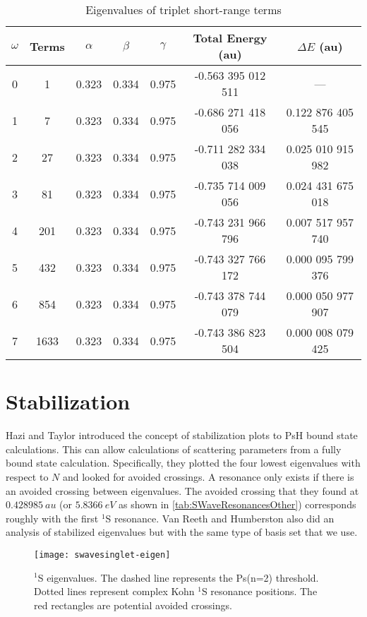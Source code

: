 \documentclass[Dissertation.tex]{subfiles}
\begin{document}
\setlength{\abovecaptionskip}{6pt}   %
\setlength{\belowcaptionskip}{6pt}   %
\begin{table}[H]
\centering
\begin{tabular}{c c c c c c c}
\toprule
$\omega$ & Terms & $\alpha$ & $\beta$ & $\gamma$ & Total Energy (au) & $\Delta E$ (au) \\ [0.5ex]
\midrule
0 & 1    & 0.323 & 0.334 & 0.975 & -0.563 395 012 511 & --- \\
1 & 7    & 0.323 & 0.334 & 0.975 & -0.686 271 418 056 & 0.122 876 405 545 \\
2 & 27   & 0.323 & 0.334 & 0.975 & -0.711 282 334 038 & 0.025 010 915 982 \\
3 & 81   & 0.323 & 0.334 & 0.975 & -0.735 714 009 056 & 0.024 431 675 018 \\
4 & 201  & 0.323 & 0.334 & 0.975 & -0.743 231 966 796 & 0.007 517 957 740 \\
5 & 432  & 0.323 & 0.334 & 0.975 & -0.743 327 766 172 & 0.000 095 799 376 \\
6 & 854  & 0.323 & 0.334 & 0.975 & -0.743 378 744 079 & 0.000 050 977 907 \\
7 & 1633 & 0.323 & 0.334 & 0.975 & -0.743 386 823 504 & 0.000 008 079 425 \\
\bottomrule
\end{tabular}
\caption{Eigenvalues of triplet short-range terms}
\label{tab:BoundEnergyTodd3}
\end{table}


\section{Stabilization}



Hazi and Taylor \cite{Hazi1970} introduced the concept of stabilization plots to PsH bound state calculations. This can allow calculations of scattering parameters from a fully bound state calculation. Specifically, they plotted the four lowest eigenvalues with respect to $N$ and looked for avoided crossings. A resonance only exists if there is an avoided crossing between eigenvalues. The avoided crossing that they found at $\SI{0.428 985}{au}$ (or $\SI{5.8366}{eV}$ as shown in \cref{tab:SWaveResonancesOther}) corresponds roughly with the first $^1$S resonance. Van Reeth and Humberston \cite{VanReeth2004} also did an analysis of stabilized eigenvalues but with the same type of basis set that we use.

\begin{figure}[H]
	\centering
	\texttt{[image: swavesinglet-eigen]}
	\caption[$^1$S eigenvalues]{$^1$S eigenvalues. The dashed line represents the Ps(n=2) threshold. Dotted lines represent complex Kohn $^1$S resonance positions. The red rectangles are potential avoided crossings.}
	\label{fig:swavesinglet-eigen}
\end{figure}
\end{document}
